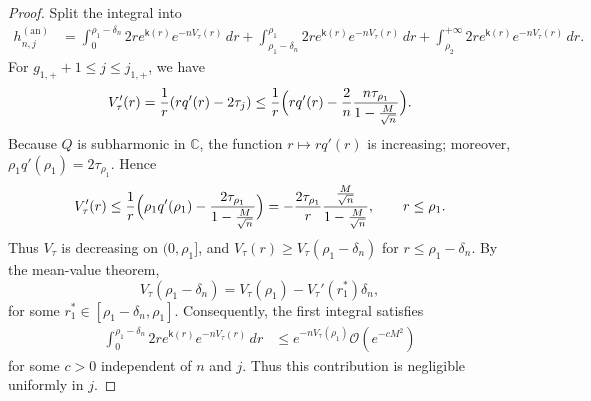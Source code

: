 \documentclass[10pt,a4paper]{amsart}
\begin{document}
\begin{proof}
Split the integral into
\begin{align*}
h_{n,j}^{(\mathrm{an})}
&=\int_{0}^{\rho_1-\delta_n}2re^{\mathsf{k}(r)}e^{-nV_{\tau}(r)}\,dr
+\int_{\rho_1-\delta_n}^{\rho_1}2re^{\mathsf{k}(r)}e^{-nV_{\tau}(r)}\,dr
+\int_{\rho_2}^{+\infty}2re^{\mathsf{k}(r)}e^{-nV_{\tau}(r)}\,dr. 
\end{align*}
For $g_{1,+}+1\leq j\leq j_{1,+}$, we have
\[
V_{\tau}'(r)=\frac{1}{r}(rq'(r)-2\tau_j)\leq \frac{1}{r}\Bigl(rq'(r)-\frac{2}{n}\frac{n\tau_{\rho_1}}{1-\frac{M}{\sqrt{n}}}\Bigr).
\]
Because $Q$ is subharmonic in $\mathbb C$, the function $r\mapsto rq'(r)$ is increasing; moreover, $\rho_1q'(\rho_1)=2\tau_{\rho_1}$. Hence
\begin{equation}
\label{def of Vtau r leq rho1ast}
V_{\tau}'(r)
\leq \frac{1}{r}\Bigl(\rho_1q'(\rho_1)-\frac{2\tau_{\rho_1}}{1-\frac{M}{\sqrt n}}\Bigr)
=-\frac{2\tau_{\rho_1}}{r}\frac{\frac{M}{\sqrt n}}{1-\frac{M}{\sqrt n}},
\qquad r\leq \rho_1.
\end{equation}
Thus $V_\tau$ is decreasing on $(0,\rho_1]$, and $V_\tau(r)\geq V_\tau(\rho_1-\delta_n)$ for $r\leq\rho_1-\delta_n$. By the mean-value theorem,
\begin{equation}
    V_{\tau}(\rho_1-\delta_n)=V_{\tau}(\rho_1)-V_{\tau}'(r_1^{\ast})\delta_n,
\end{equation}
for some $r_{1}^{\ast}\in[\rho_1-\delta_n,\rho_1]$. 
Consequently, the first integral satisfies
\begin{align*}
\int_{0}^{\rho_1-\delta_n}2re^{\mathsf{k}(r)}e^{-nV_{\tau}(r)}\,dr
&\leq e^{-nV_{\tau}(\rho_1)}\mathcal O(e^{-cM^2})
\end{align*}
for some $c>0$ independent of $n$ and $j$. Thus this contribution is negligible uniformly in $j$.
 

\end{proof}
\end{document}
